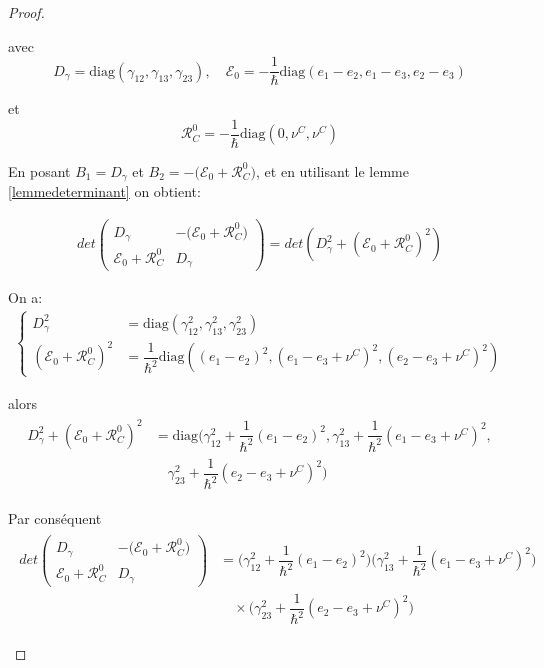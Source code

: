 \documentclass[12pt,a4paper,openany,oneside]{book}
\begin{document}
{{{{{{\begin{proof}
\begin{enumerate}
 avec $$ D_{\gamma} = \textrm{diag}(\gamma_{12},\gamma_{13}, \gamma_{23}), \quad \mathcal{E}_{0} =- \dfrac{1}{\hbar}  \textrm{diag}(e_{1}-e_{2},e_{1}-e_{3}, e_{2}-e_{3}) $$

et 
$$ \mathcal{R}^{0}_{C} =- \dfrac{1}{\hbar}  \textrm{diag}(0,\nu^{C}, \nu^{C})$$  


En posant 
$ B_{1} = D_{\gamma} $ et $ B_{2} = -\big(\mathcal{E}_{0}+ \mathcal{R}^{0}_{C}\big) $, et en utilisant le lemme \ref{lemmedeterminant} on obtient:

 \begin{eqnarray*}
det\begin{pmatrix}
   D_{\gamma}                &  -\big(\mathcal{E}_{0}+ \mathcal{R}^{0}_{C}\big)  \\
   \mathcal{E}_{0}+ \mathcal{R}^{0}_{C}  &  D_{\gamma}
\end{pmatrix}= det (  D_{\gamma}^{2}+ (\mathcal{E}_{0}+ \mathcal{R}^{0}_{C})^{2})
\end{eqnarray*}

On a: 
 \begin{eqnarray*}
\left\{
\begin{split}
D_{\gamma}^{2}&= \textrm{diag}(\gamma_{12}^{2},\gamma_{13}^{2}, \gamma_{23}^{2})\\ 
(\mathcal{E}_{0}+ \mathcal{R}^{0}_{C})^{2}&= \dfrac{1}{\hbar^{2}}\textrm{diag}((e_{1}-e_{2})^{2},(e_{1}-e_{3}+\nu^{C})^{2}, (e_{2}-e_{3}+\nu^{C})^{2})
\end{split}
   \right.   
  \end{eqnarray*}
  
  alors 
  \begin{eqnarray*}
  \begin{split}
  D_{\gamma}^{2}+ (\mathcal{E}_{0}+ \mathcal{R}^{0}_{C})^{2}&= \textrm{diag}\Big(\gamma_{12}^{2}+\dfrac{1}{\hbar^{2}}(e_{1}-e_{2})^{2},\gamma_{13}^{2}+\dfrac{1}{\hbar^{2}}(e_{1}-e_{3}+\nu^{C})^{2},\\& \quad \gamma_{23}^{2} +\dfrac{1}{\hbar^{2}}(e_{2}-e_{3}+\nu^{C})^{2}\Big)
  \end{split}
    \end{eqnarray*}

Par conséquent  
\begin{eqnarray*}
\begin{split}
det\begin{pmatrix}
   D_{\gamma}                &  -\big(\mathcal{E}_{0}+\mathcal{R}^{0}_{C}\big)  \\
   \mathcal{E}_{0}+ \mathcal{R}^{0}_{C}  &  D_{\gamma}
\end{pmatrix}&= \Big(\gamma_{12}^{2}+\dfrac{1}{\hbar^{2}}(e_{1}-e_{2})^{2}\Big)\Big(\gamma_{13}^{2}+\dfrac{1}{\hbar^{2}}(e_{1}-e_{3}+\nu^{C})^{2}\Big)\\
&\quad\times\Big(\gamma_{23}^{2} +\dfrac{1}{\hbar^{2}}(e_{2}-e_{3}+\nu^{C})^{2}\Big)
\end{split}
\end{eqnarray*}


\end{enumerate}
\end{proof}}}}}}}
\end{document}
